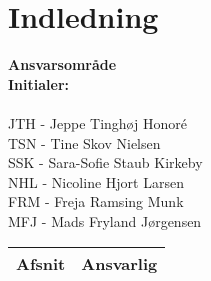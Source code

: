 \chapter{Indledning}


\textbf{Ansvarsområde} \\
\textbf{Initialer: } \\
\\
JTH - Jeppe Tinghøj Honoré\\
TSN - Tine Skov Nielsen\\
SSK - Sara-Sofie Staub Kirkeby\\
NHL - Nicoline Hjort Larsen\\
FRM - Freja Ramsing Munk\\
MFJ - Mads Fryland Jørgensen\\

\begin{longtabu} to 
    Afsnit &    Ansvarlig\\[-1ex]
    \midrule
   
    
    
    

\end{longtabu}
